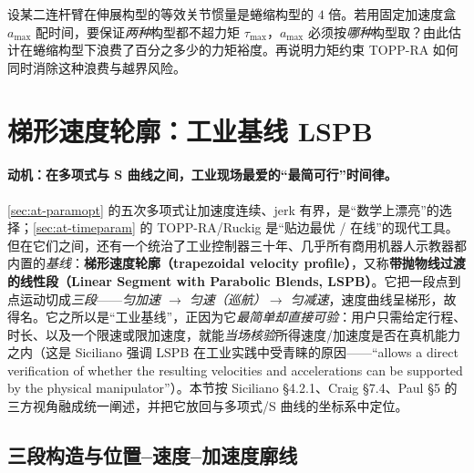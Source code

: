 \begin{exercise}
设某二连杆臂在伸展构型的等效关节惯量是蜷缩构型的 $4$ 倍。若用固定加速度盒 $a_{\max}$ 配时间，要保证\emph{两种}构型都不超力矩 $\tau_{\max}$，$a_{\max}$ 必须按\emph{哪种}构型取？由此估计在蜷缩构型下浪费了百分之多少的力矩裕度。再说明力矩约束 TOPP-RA 如何同时消除这种浪费与越界风险。
\end{exercise}

\section{梯形速度轮廓：工业基线 LSPB}
\label{sec:at-trapezoidal}

\paragraph{动机：在多项式与 S 曲线之间，工业现场最爱的“最简可行”时间律。}
\cref{sec:at-paramopt} 的五次多项式让加速度连续、jerk 有界，是“数学上漂亮”的选择；\cref{sec:at-timeparam} 的 TOPP-RA/Ruckig 是“贴边最优 / 在线”的现代工具。但在它们之间，还有一个统治了工业控制器三十年、几乎所有商用机器人示教器都内置的\emph{基线}：\textbf{梯形速度轮廓（trapezoidal velocity profile）}，又称\textbf{带抛物线过渡的线性段（Linear Segment with Parabolic Blends, LSPB）}。它把一段点到点运动切成\emph{三段}——\emph{匀加速 $\to$ 匀速（巡航）$\to$ 匀减速}，速度曲线呈梯形，故得名。它之所以是“工业基线”，正因为它\emph{最简单却直接可验}：用户只需给定行程、时长、以及一个限速或限加速度，就能\emph{当场核验}所得速度/加速度是否在真机能力之内（这是 Siciliano 强调 LSPB 在工业实践中受青睐的原因——“allows a direct verification of whether the resulting velocities and accelerations can be supported by the physical manipulator”\cite{siciliano2009robotics}）。本节按 Siciliano §4.2.1、Craig §7.4、Paul §5 的三方视角融成统一阐述，并把它放回与多项式/S 曲线的坐标系中定位。

\subsection{三段构造与位置--速度--加速度廓线}
\label{subsec:at-trap-build}

